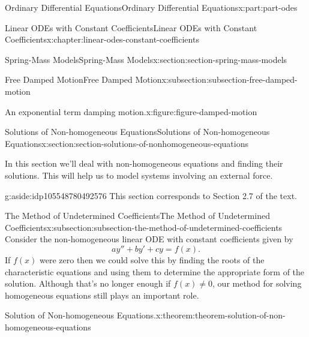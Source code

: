 \documentclass[oneside,10pt,]{book}
\numberwithin{equation}{part}
\begin{document}
\begin{partptx}{Ordinary Differential Equations}{}{Ordinary Differential Equations}{}{}{x:part:part-odes}
\begin{chapterptx}{Linear ODEs with Constant Coefficients}{}{Linear ODEs with Constant Coefficients}{}{}{x:chapter:linear-odes-constant-coefficients}
\begin{sectionptx}{Spring-Mass Models}{}{Spring-Mass Models}{}{}{x:section:section-spring-mass-models}
\begin{subsectionptx}{Free Damped Motion}{}{Free Damped Motion}{}{}{x:subsection:subsection-free-damped-motion}
\begin{figureptx}{An exponential term damping motion.}{x:figure:figure-damped-motion}{}
\begin{image}{0.25}{0.5}{0.25}
{
}%
\end{image}%
\tcblower
\end{figureptx}%
\end{subsectionptx}
\end{sectionptx}
%
%
\typeout{************************************************}
\typeout{************************************************}
%
\begin{sectionptx}{Solutions of Non-homogeneous Equations}{}{Solutions of Non-homogeneous Equations}{}{}{x:section:section-solutions-of-nonhomogeneous-equations}
\begin{introduction}{}%
In this section we'll deal with non-homogeneous equations and finding their solutions. This will help us to model systems involving an external force.%
\begin{aside}{}{g:aside:idp105548780492576}%
This section corresponds to Section 2.7 of the text.%
\end{aside}
\end{introduction}%
%
%
\typeout{************************************************}
\typeout{************************************************}
%
\begin{subsectionptx}{The Method of Undetermined Coefficients}{}{The Method of Undetermined Coefficients}{}{}{x:subsection:subsection-the-method-of-undetermined-coefficients}
Consider the non-homogeneous linear ODE with constant coefficients given by%
\begin{equation}
ay'' + by' + cy = f(x).\label{x:men:equation-non-homogeneous}
\end{equation}
If \(f(x)\) were zero then we could solve this by finding the roots of the characteristic equations and using them to determine the appropriate form of the solution. Although that's no longer enough if \(f(x)\neq0\), our method for solving homogeneous equations still plays an important role.%
\begin{theorem}{Solution of Non-homogeneous Equations.}{}{x:theorem:theorem-solution-of-non-homogeneous-equations}%

\end{theorem}
\end{subsectionptx}
\end{sectionptx}
\end{chapterptx}
\end{partptx}
\end{document}
